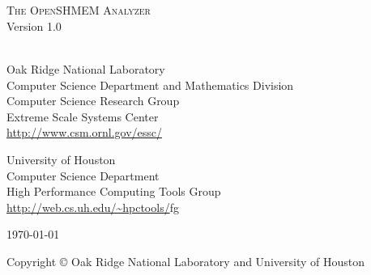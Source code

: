 \begin{titlepage}
  \begin{center}

    \vspace{1.0in} ~ \\

    \HRule \\[0.1in]
    {\LARGE \textsc{The OpenSHMEM Analyzer}} \\
    \vspace{0.2in}
    {\LARGE Version 1.0} \\
    \HRule \\[0.5in]

    \vspace{0.5in}

    Oak Ridge National Laboratory \\
    Computer Science Department and Mathematics Division \\
    Computer Science Research Group \\
    Extreme Scale Systems Center \\
    \vspace{0.1in}
    \url{http://www.csm.ornl.gov/essc/}

    \vspace{0.4in}

    University of Houston \\
    Computer Science Department \\
    High Performance Computing Tools Group \\
    \vspace{0.1in}
    \url{http://web.cs.uh.edu/~hpctools/}fg

    \vspace{1.0in}

    \today

    \vspace{1.0in}

    Copyright \copyright{} \the\year{} Oak Ridge National Laboratory and University of Houston

  \end{center}
\end{titlepage}
